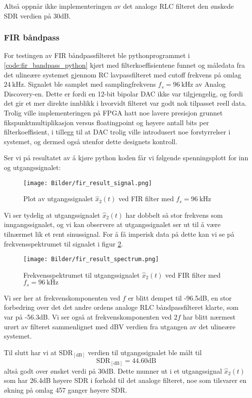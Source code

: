 Altså oppnår ikke implementeringen av det analoge RLC filteret den ønskede SDR verdien på 30dB.

\subsubsection{FIR båndpass}
For testingen av FIR båndpassfilteret ble pythonprogrammet i \ref{code:fir_bandpass_python} kjørt med filterkoeffisientene 
funnet og måledata fra det ulineære systemet gjennom RC lavpassfilteret med cutoff frekvens på omlag $\SI{24}{\kilo\hertz}$. 
Signalet ble samplet med samplingfrekvens $f_s = \SI{96}{\kilo\hertz}$ av Analog Discovery-en.
Dette er fordi en 12-bit bipolar DAC ikke var tilgjengelig, og fordi det gir et mer direkte innblikk i hvorvidt filteret 
var godt nok tilpasset reell data. Trolig ville implementeringen på FPGA hatt noe lavere presisjon grunnet fikspunktmultiplikasjon 
versus floatingpoint og høyere antall bits per filterkoeffisient, i tillegg til at DAC trolig ville introdusert noe forstyrrelser i systemet, og 
dermed også utenfor dette designets kontroll.

Ser vi på resultatet av å kjøre python koden får vi følgende spenningsplott for inn og utgangssignalet:
\begin{figure}[H]
    \centering 
    \texttt{[image: Bilder/fir\_result\_signal.png]}
    \caption{Plot av utgangssignalet $\hat{x}_2(t)$ ved FIR filter med $f_s = \SI{96}{\kilo\hertz}$}
    \label{fig:fir_result_signal}
\end{figure}

Vi ser tydelig at utgangssignalet $\hat{x}_2(t)$ har dobbelt så stor frekvens som inngangssignalet, og vi kan
observere at utgangssignalet ser ut til å være tilnærmet lik et rent sinussignal.
For å få imperisk data på dette kan vi se på frekvensspektrumet til signalet i figur \ref{fig:fir_result_spectrum}.
\begin{figure}[H]
    \centering 
    \texttt{[image: Bilder/fir\_result\_spectrum.png]}
    \caption{Frekvensspektrumet til utgangssignalet $\hat{x}_2(t)$ ved FIR filter med $f_s = \SI{96}{\kilo\hertz}$}
    \label{fig:fir_result_spectrum}
\end{figure}

Vi ser her at frekvenskomponenten ved $f$ er blitt dempet til -96.5dB, en stor forbedring over det det andre ordens 
analoge RLC båndpassfilteret klarte, som var på -56.3dB. Vi ser også at frekvenskomponenten ved $2f$ har blitt nærmest 
urørt av filteret sammenlignet med dBV verdien fra utgangen av det ulineære systemet.

Til slutt har vi at $\text{SDR}_{[\text{dB}]}$ verdien til utgangssignalet ble målt til
\[
    \text{SDR}_{[\text{dB}]} = 44.60\text{dB}
\]
altså godt over ønsket verdi på 30dB. Dette munner ut i et utgangssignal $\hat{x}_2(t)$ som har 26.4dB høyere 
SDR i forhold til det analoge filteret, noe som tilsvarer en økning på omlag 457 ganger høyere SDR.


